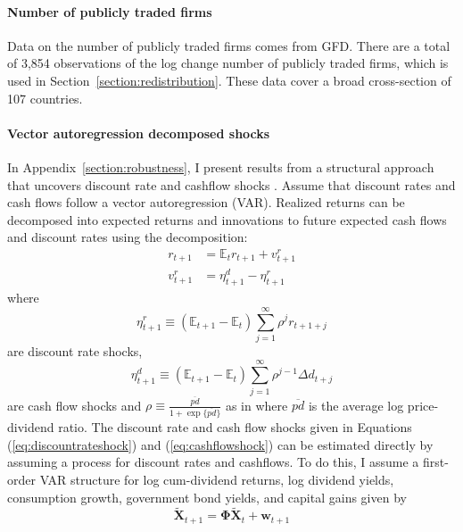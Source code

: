 \documentclass[12pt]{article}
\numberwithin{equation}{section}
\newcommand{\E}{\mathbb{E}}
\begin{document}
\paragraph{Number of publicly traded firms}
Data on the number of publicly traded firms comes from GFD. There are a total of 3,854 observations of the log change number of publicly traded firms, which is used in Section~\ref{section:redistribution}. These data cover a broad cross-section of 107 countries.

\paragraph{Vector autoregression decomposed shocks}
In Appendix~\ref{section:robustness}, I present results from a structural approach that uncovers discount rate and cashflow shocks \citep{Campbell1991}. Assume that discount rates and cash flows follow a vector autoregression (VAR). Realized returns can be decomposed into expected returns and innovations to future expected cash flows and discount rates using the decomposition:
\begin{align}
r_{t+1}   & = \E_{t} r_{t+1}+v^{r}_{t+1}\label{eq:fulldecomp} \\
v^{r}_{t+1} &= \eta^{d}_{t+1} -\eta^{r}_{t+1}\label{eq:errordecomp}
\end{align}
where
\begin{equation}
\eta^{r}_{t+1} \equiv\left(\E_{t+1}-\E_{t}\right) \sum_{j=1}^{\infty} \rho^{j} r_{t+1+j}\label{eq:discountrateshock}
\end{equation}
are discount rate shocks,
\begin{equation}
\eta^{d}_{t+1} \equiv\left(\E_{t+1}-\E_{t}\right) \sum_{j=1}^{\infty} \rho^{j-1} \Delta d_{t+j}\label{eq:cashflowshock}
\end{equation}
are cash flow shocks and $\rho \equiv \frac{\overline{pd}}{1+\exp\{\overline{pd}\}}$ as in \cite{Campbell1988} where $\overline{pd}$ is the average log price-dividend ratio.  The discount rate and cash flow shocks given in Equations (\ref{eq:discountrateshock}) and (\ref{eq:cashflowshock}) can be estimated directly by assuming a process for discount rates and cashflows. To do this, I assume a first-order VAR structure for log cum-dividend returns, log dividend yields, consumption growth, government bond yields, and capital gains given by 
\begin{equation}
\tilde{\mathbf{X}}_{t+1}=\mathbf{\Phi}\tilde{\mathbf{X}}_{t}+\mathbf{w}_{t+1}\label{eq:VARsetup}
\end{equation}
\end{document}
